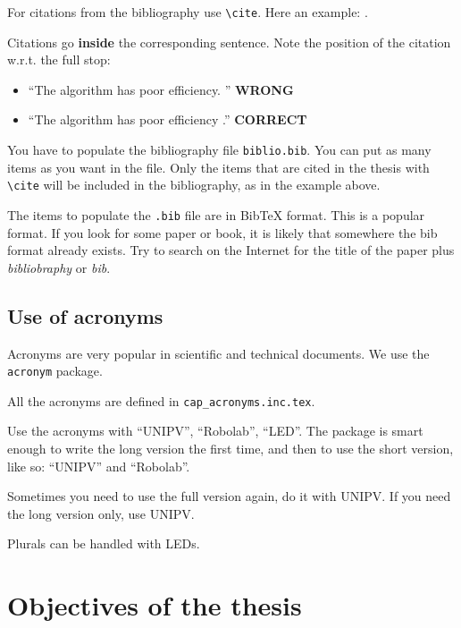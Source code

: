 For citations from the bibliography use \texttt{\textbackslash cite}.
Here an example: \cite{example-citation}.

Citations go \textbf{inside} the corresponding sentence.
Note the position of the citation w.r.t. the full stop:

\begin{itemize}
\item \enquote{The algorithm has poor efficiency. \cite{example-citation}} \textbf{WRONG}
\item \enquote{The algorithm has poor efficiency \cite{example-citation}.} \textbf{CORRECT}
\end{itemize}

You have to populate the bibliography file \texttt{biblio.bib}.
You can put as many items as you want in the file.
Only the items that are cited in the thesis with \texttt{\textbackslash cite} will be included in the bibliography, as in the example above.

The items to populate the \texttt{.bib} file are in BibTeX format.
This is a popular format.
If you look for some paper or book, it is likely that somewhere the bib format already exists.
Try to search on the Internet for the title of the paper plus \textit{bibliobraphy} or \textit{bib}.

\subsection{Use of acronyms}

Acronyms are very popular in scientific and technical documents.
We use the \texttt{acronym} package.

All the acronyms are defined in \texttt{cap\_acronyms.inc.tex}.

Use the acronyms with \enquote{\ac{UNIPV}}, \enquote{\ac{Robolab}}, \enquote{\ac{LED}}.
The package is smart enough to write the long version the first time, and then to use the short version, like so: \enquote{\ac{UNIPV}} and \enquote{\ac{Robolab}}.

Sometimes you need to use the full version again, do it with \acf{UNIPV}.
If you need the long version only, use \acl{UNIPV}.

Plurals can be handled with \acp{LED}.

\section{Objectives of the thesis}


